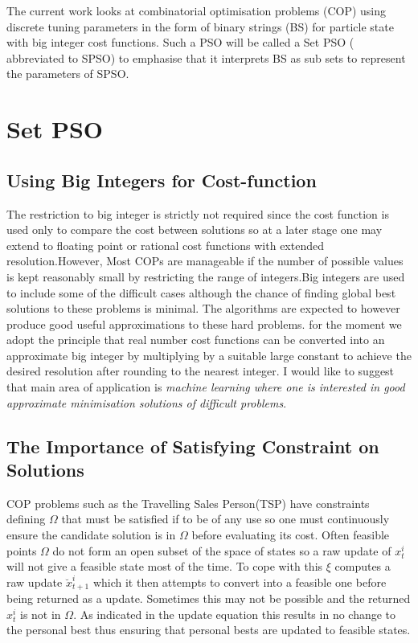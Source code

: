 \documentclass[a4paper,oneside,english]{article}
\numberwithin{equation}{section}
\numberwithin{figure}{section}
\begin{document}
The current work looks at combinatorial optimisation problems (COP) using discrete tuning parameters in the form of binary strings (BS) for particle state with big integer cost functions. Such  a PSO will be called a Set PSO ( abbreviated to SPSO) to emphasise that it interprets BS as  sub sets to represent the parameters of SPSO. 

\section{Set PSO}
\subsection{Using Big Integers for Cost-function }   
The restriction to big integer is strictly not required since the cost function is used only to compare the cost between solutions so at a later stage one  may extend to floating point or rational cost functions with extended resolution.However, Most COPs are manageable if the number of possible values is kept reasonably small by restricting the range of integers.Big integers are used to include some of the difficult cases although the chance of finding global best solutions to these problems is minimal. The algorithms are expected to however produce good useful approximations to these hard problems. for the moment we adopt the principle that real number cost functions can be converted into an approximate big integer by multiplying by a suitable large constant  to achieve the desired resolution after rounding to the nearest integer. I would like to suggest that main area of application is \emph{machine learning where one is interested in good approximate minimisation solutions of difficult problems}.


\subsection{The Importance of Satisfying Constraint on Solutions }
COP problems such as the Travelling Sales Person(TSP) have constraints defining $\varOmega$ that must be satisfied if to be of any use so one must continuously ensure the candidate solution is in $\varOmega$ before evaluating its cost. Often feasible points $\varOmega$ do not form an open subset of the space of states so a raw update of $x_t^i$ will not give a feasible state most of the time. To cope with this $\xi$ computes a raw update $\breve{x}_{t+1}^i$ which it then attempts to  convert into a feasible one before being returned as a update. Sometimes this may not be possible and the returned $x_t^i$ is not in $\varOmega$. As indicated in the update equation this results in no change to the personal best thus ensuring that personal bests are updated to feasible states.   
\end{document}
